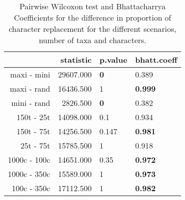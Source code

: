 \begin{table}[ht]
\centering
\begin{tabular}{rrll}
  \hline
 & statistic & p.value & bhatt.coeff \\ 
  \hline
maxi - mini & 29607.000 & \textbf{0} & 0.389 \\ 
  maxi - rand & 16436.500 & 1 & \textbf{0.999} \\ 
  mini - rand & 2826.500 & \textbf{0} & 0.382 \\ 
  150t - 25t & 14098.000 & 0.1 & 0.934 \\ 
  150t - 75t & 14256.500 & 0.147 & \textbf{0.981} \\ 
  25t - 75t & 15785.500 & 1 & 0.918 \\ 
  1000c - 100c & 14651.000 & 0.35 & \textbf{0.972} \\ 
  1000c - 350c & 15589.000 & 1 & \textbf{0.973} \\ 
  100c - 350c & 17112.500 & 1 & \textbf{0.982} \\ 
   \hline
\end{tabular}
\caption{Pairwise Wilcoxon test and Bhattacharrya Coefficients for the difference in proportion of character replacement for the different scenarios, number of taxa and characters.} 
\label{Tab_proportion_replacement}
\end{table}

